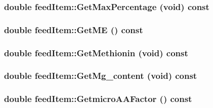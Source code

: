 \label{classfeed_item_ab371de23a9de676670776b7af72a510f}
\hypertarget{classfeed_item_a4d48b3435d41b59af68be30722fcab7f}{
\subsubsection[{GetMaxPercentage}]{\setlength{\rightskip}{0pt plus 5cm}double feedItem::GetMaxPercentage (void) const}}
\label{classfeed_item_a4d48b3435d41b59af68be30722fcab7f}
\hypertarget{classfeed_item_a8691a50ce52a8c3da1d022cae9b4ff13}{
\subsubsection[{GetME}]{\setlength{\rightskip}{0pt plus 5cm}double feedItem::GetME () const}}
\label{classfeed_item_a8691a50ce52a8c3da1d022cae9b4ff13}
\hypertarget{classfeed_item_ac0bd79ba7a1d138019d575f663d8c90e}{
\subsubsection[{GetMethionin}]{\setlength{\rightskip}{0pt plus 5cm}double feedItem::GetMethionin (void) const}}
\label{classfeed_item_ac0bd79ba7a1d138019d575f663d8c90e}
\hypertarget{classfeed_item_ae07f366eec4cd04e9341405529c7dde7}{
\subsubsection[{GetMg\_\-content}]{\setlength{\rightskip}{0pt plus 5cm}double feedItem::GetMg\_\-content (void) const}}
\label{classfeed_item_ae07f366eec4cd04e9341405529c7dde7}
\hypertarget{classfeed_item_aa8f5021c52de69702c08d5c8bb543a49}{
\subsubsection[{GetmicroAAFactor}]{\setlength{\rightskip}{0pt plus 5cm}double feedItem::GetmicroAAFactor () const}}
